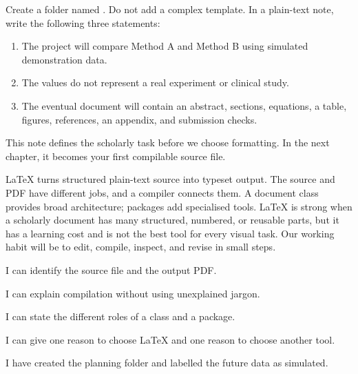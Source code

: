 \chapterproject

\begin{miniproject}
Create a folder named . Do not add a complex
template. In a plain-text note, write the following three statements:

\begin{enumerate}
  \item The project will compare Method A and Method B using simulated
        demonstration data.
  \item The values do not represent a real experiment or clinical study.
  \item The eventual document will contain an abstract, sections, equations,
        a table, figures, references, an appendix, and submission checks.
\end{enumerate}

This note defines the scholarly task before we choose formatting. In the next
chapter, it becomes your first compilable source file.
\end{miniproject}

\chaptersummary

\LaTeX{} turns structured plain-text source into typeset output. The source and
PDF have different jobs, and a compiler connects them. A document class
provides broad architecture; packages add specialised tools. \LaTeX{} is strong
when a scholarly document has many structured, numbered, or reusable parts,
but it has a learning cost and is not the best tool for every visual task. Our
working habit will be to edit, compile, inspect, and revise in small steps.

\chaptercheck

\begin{chapterchecklist}
  \item I can identify the source file and the output PDF.
  \item I can explain compilation without using unexplained jargon.
  \item I can state the different roles of a class and a package.
  \item I can give one reason to choose \LaTeX{} and one reason to choose another
        tool.
  \item I have created the planning folder and labelled the future data as
        simulated.
\end{chapterchecklist}

\chapterexercisestitle

